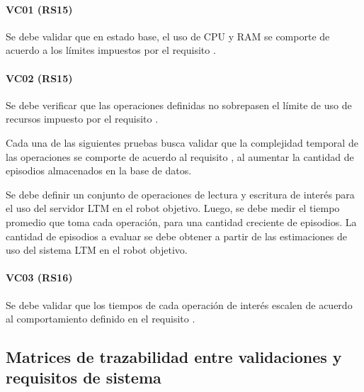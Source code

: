 \paragraph{VC01 (RS15)}
Se debe validar que en estado base, el uso de CPU y RAM se comporte de acuerdo a los límites impuestos por el requisito .

\paragraph{VC02 (RS15)}
Se debe verificar que las operaciones definidas no sobrepasen el límite de uso de recursos impuesto por el requisito .


Cada una de las siguientes pruebas busca validar que la complejidad temporal de las operaciones se comporte de acuerdo al requisito , al aumentar la cantidad de episodios almacenados en la base de datos. 

Se debe definir un conjunto de operaciones de lectura y escritura de interés para el uso del servidor LTM en el robot objetivo. Luego, se debe medir el tiempo promedio que toma cada operación, para una cantidad creciente de episodios. La cantidad de episodios a evaluar se debe obtener a partir de las estimaciones de uso del sistema LTM en el robot objetivo.

\paragraph{VC03 (RS16)}
Se debe validar que los tiempos de cada operación de interés escalen de acuerdo al comportamiento definido en el requisito .


\subsection{Matrices de trazabilidad entre validaciones y requisitos de sistema}

